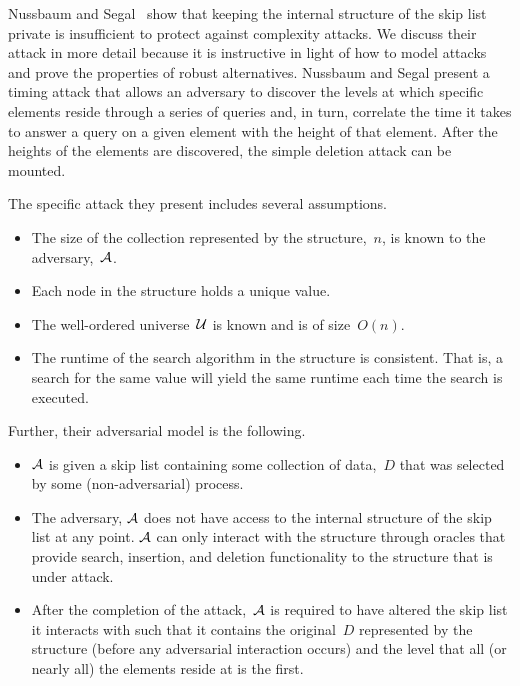 Nussbaum and Segal~\cite{nussbaum2019skiplist} show that keeping the internal structure of the skip list private is insufficient to protect against complexity attacks. We discuss their attack in more detail because it is instructive in light of how to model attacks and prove the properties of robust alternatives.
Nussbaum and Segal present a timing attack that allows an adversary to discover the levels at which specific elements reside through a series of queries and, in turn, correlate the time it takes to answer a query on a given element with the height of that element. After the heights of the elements are discovered, the simple deletion attack can be mounted. 

The specific attack they present includes several assumptions.

\begin{itemize}
    \item The size of the collection represented by the structure,~$n$, is known to the adversary,~$\mathcal{A}$.
    \item Each node in the structure holds a unique value.
    \item The well-ordered universe~$\mathcal{U}$ is known and is of size~$O(n)$.
    \item The runtime of the search algorithm in the structure is consistent. That is, a search for the same value will yield the same runtime each time the search is executed.
\end{itemize}

Further, their adversarial model is the following. 

\begin{itemize}
    \item $\mathcal{A}$ is given a skip list containing some collection of data,~$D$ that was selected by some (non-adversarial) process. 
    \item The adversary, $\mathcal{A}$ does not have access to the internal structure of the skip list at any point. $\mathcal{A}$ can only interact with the structure through oracles that provide search, insertion, and deletion functionality to the structure that is under attack.
    \item After the completion of the attack,~$\mathcal{A}$ is required to have altered the skip list it interacts with such that it contains the original~$D$ represented by the structure (before any adversarial interaction occurs) and the level that all (or nearly all) the elements reside at is the first.  
\end{itemize}

